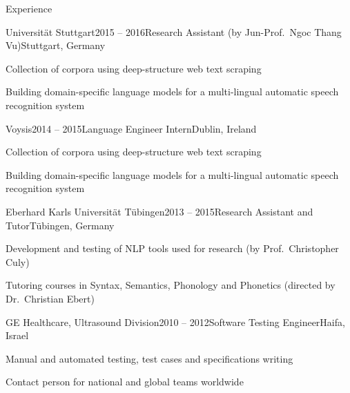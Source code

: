 \documentclass{resume} %
\begin{document}
\begin{rSection}{Experience}

\begin{rSubsection}{Universität Stuttgart}{2015 -- 2016}{Research Assistant (by Jun-Prof.\ Ngoc Thang Vu)}{Stuttgart, Germany}
	\setlength{\itemindent}{.7cm}
	
	\item Collection of corpora using deep-structure web text scraping
	
	\item Building domain-specific language models for a multi-lingual automatic speech recognition system 
\end{rSubsection}

\begin{rSubsection}{Voysis}{2014 -- 2015}{Language Engineer Intern}{Dublin, Ireland}
	\setlength{\itemindent}{.7cm}
	
	\item Collection of corpora using deep-structure web text scraping
	
	\item Building domain-specific language models for a multi-lingual automatic speech recognition system 
\end{rSubsection}

\begin{rSubsection}{Eberhard Karls Universität Tübingen}{2013 -- 2015}{Research Assistant and Tutor}{Tübingen, Germany}
	\setlength{\itemindent}{.7cm}
	
	\item Development and testing of NLP tools used for research (by Prof.\ Christopher Culy)
	
	\item Tutoring courses in Syntax, Semantics, Phonology and Phonetics (directed by Dr.\ Christian Ebert)
\end{rSubsection}

\begin{rSubsection}{GE Healthcare, Ultrasound Division}{2010 -- 2012}{Software Testing Engineer}{Haifa, Israel}
	\setlength{\itemindent}{.7cm}
	
	\item Manual and automated testing, test cases and specifications writing
	
	\item Contact person for national and global teams worldwide 
\end{rSubsection}


\end{rSection}
\end{document}
